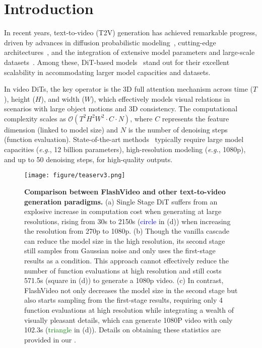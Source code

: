 \section{Introduction}

In recent years, text-to-video (T2V) generation has achieved remarkable progress, driven by advances in diffusion probabilistic modeling~\citep{diffusion, ho2020denoising, rectifiedflow, fm}, cutting-edge architectures~\citep{unet, dit}, and the integration of extensive model parameters and large-scale datasets~\citep{lvdm, cogvideo, videocrafter1, videocrafter2, videopoet, opensora, cogvideox, sora}. Among these, DiT-based models~\citep{dit} stand out for their excellent scalability in accommodating larger model capacities and datasets. 

In video DiTs, the key operator is the 3D full attention mechanism across time ($T$), height ($H$), and width ($W$), which effectively models visual relations in scenarios with large object motions and 3D consistency. The computational complexity scales as $\mathcal{O}(T^2 H^2 W^2 \cdot C \cdot N)$, where $C$ represents the feature dimension (linked to model size) and $N$ is the number of denoising steps (function evaluation). State-of-the-art methods~\citep{moviegen, kong2024hunyuanvideo, cogvideox} typically require large model capacities (\textit{e.g.}, 12 billion parameters), high-resolution modeling (\textit{e.g.}, 1080p), and up to 50 denoising steps, for high-quality outputs. 

\begin{figure}[t]
\begin{center}
\texttt{[image: figure/teaserv3.png]}
\end{center}
\caption{ \textbf{Comparison between FlashVideo and other text-to-video generation paradigms.} 
(a) Single Stage DiT suffers from an explosive increase in computation cost when generating at large resolutions, rising from 30s to 2150s (\textcolor{blue}{circle} in (d)) when increasing the resolution from 270p to 1080p. (b) Though the vanilla cascade can reduce the model size in the high resolution, its second stage still samples from Gaussian noise and only uses the first-stage results as a condition. This approach cannot effectively reduce the number of function evaluations at high resolution and still costs 571.5s ({\textcolor{earthyellow}{square} in (d)}) to generate a 1080p video. (c) In contrast, FlashVideo not only decreases the model size in the second stage but also starts sampling from the first-stage results,  requiring only 4 function evaluations at high resolution while integrating a wealth of visually pleasant details, which can generate 1080P video with only 102.3s (\textcolor{green}{triangle} in (d)). Details on obtaining these statistics are provided in our \supp. }
\end{figure}\label{fig:teaser}

